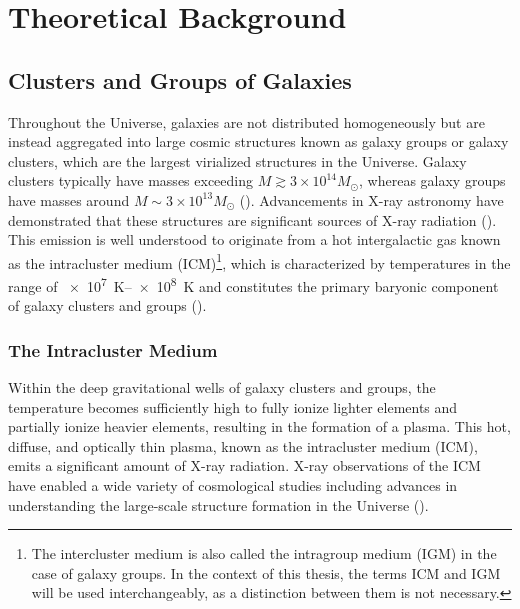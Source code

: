 
\chapter{Theoretical Background}
\label{sec:theoretical_background}
\section{Clusters and Groups of Galaxies}\label{sec:clusters}
Throughout the Universe, galaxies are not distributed homogeneously but are instead aggregated into large cosmic structures known as galaxy groups or galaxy clusters, which are the largest virialized structures in the Universe. Galaxy clusters typically have masses exceeding \(M \gtrsim 3 \times 10^{14} M_{\odot}\), whereas galaxy groups have masses around \(M \sim 3 \times 10^{13} M_{\odot}\) (\cite{Schneider_2006}). Advancements in X-ray astronomy have demonstrated that these structures are significant sources of X-ray radiation (\cite{Cavaliere_1971}). This emission is well understood to originate from a hot intergalactic gas known as the intracluster medium (ICM)\footnote{The intercluster medium is also called the intragroup medium (IGM) in the case of galaxy groups. In the context of this thesis, the terms ICM and IGM will be used interchangeably, as a distinction between them is not necessary.}, which is characterized by temperatures in the range of \SIrange{e7}{e8}{\kelvin} and constitutes the primary baryonic component of galaxy clusters and groups (\cite{Schneider_2006}).
%
\subsection{The Intracluster Medium}
Within the deep gravitational wells of galaxy clusters and groups, the temperature becomes sufficiently high to fully ionize lighter elements and partially ionize heavier elements, resulting in the formation of a plasma. This hot, diffuse, and optically thin plasma, known as the intracluster medium (ICM), emits a significant amount of X-ray radiation. X-ray observations of the ICM have enabled a wide variety of cosmological studies including advances in understanding the large-scale structure formation in the Universe (\cite{KravtsovBorgani2012}).
%
